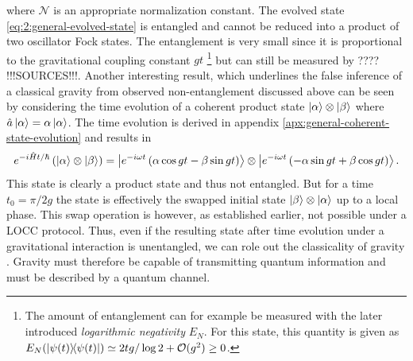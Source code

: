 where $\mathcal{N}$ is an appropriate normalization constant. The evolved state \eqref{eq:2:general-evolved-state} is entangled and cannot be reduced into a product of two oscillator Fock states. The entanglement is very small since it is proportional to the gravitational coupling constant $gt$ \footnote{The amount of entanglement can for example be measured with the later introduced \textit{logarithmic negativity} $E_N$. For this state, this quantity is given as $E_N(\ketbra{\psi(t)}) \simeq 2tg/\log 2 + \mathcal{O}(g^2) \geq 0$.} but can still be measured by ???? !!!SOURCES!!!.
Another interesting result, which underlines the false inference of a classical gravity from observed non-entanglement discussed above can be seen by considering the time evolution of a coherent product state $\ket{\alpha} \otimes \ket{\beta}$ where $\hat{a}\ket{\alpha} = \alpha\ket{\alpha}$. The time evolution is derived in appendix \ref{apx:general-coherent-state-evolution} and results in
\begin{equation}
  e^{-i\hat{H}t/\hbar} \left( \ket{\alpha} \otimes \ket{\beta} \right) = \ket{ e^{-i\omega t} \left( \alpha \cos gt - \beta \sin gt \right) }\otimes\ket{ e^{-i\omega t} \left( - \alpha \sin gt + \beta \cos gt \right) } .
\end{equation}
This state is clearly a product state and thus not entangled. But for a time $t_0 = \pi/2g$ the state is effectively the swapped initial state $\ket{\beta} \otimes \ket{\alpha}$ up to a local phase. This swap operation is however, as established earlier, not possible under a LOCC protocol. Thus, even if the resulting state after time evolution under a gravitational interaction is unentangled, we can role out the classicality of gravity \cite{Carney_2018,Lami_2024}. 
Gravity must therefore be capable of transmitting quantum information and must be described by a quantum channel.

